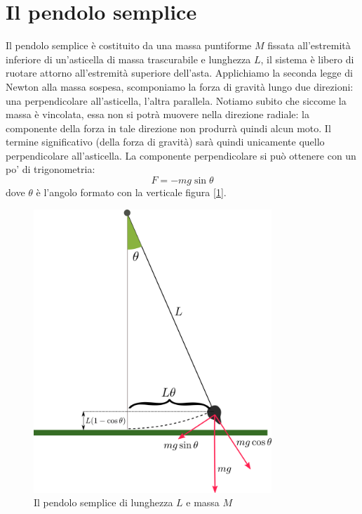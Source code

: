 \documentclass[a4paper,10pt,oneside]{article}
\begin{document}
\section*{Il pendolo semplice}


Il pendolo semplice è costituito da una massa puntiforme $M$ fissata all'estremità inferiore di un'asticella di massa trascurabile e lunghezza $L$, il sistema è libero di ruotare attorno all'estremità superiore dell'asta. Applichiamo la seconda legge di Newton alla massa sospesa, scomponiamo la forza di gravità lungo due direzioni: una perpendicolare all'asticella, l'altra parallela. Notiamo subito che siccome la massa è vincolata,  essa non si potrà muovere nella direzione radiale: la componente della forza in tale direzione non produrrà quindi alcun moto. Il termine significativo (della forza di gravità)  sarà quindi unicamente quello perpendicolare all'asticella.
La componente perpendicolare  si può ottenere con un po' di trigonometria:
\begin{equation}\label{pendolo_completo}
 F=-mg\sin\theta
\end{equation}
dove $\theta$ è l'angolo formato con la verticale figura [\ref{fig:pendolo_semplice}].
\begin{figure}[H]
 \centering
 \includegraphics[width=0.8\textwidth]{./immagini/pendolo_semplice.png}
 \caption{Il pendolo semplice di lunghezza $L$ e massa $M$}\label{fig:pendolo_semplice}
\end{figure}
\end{document}
